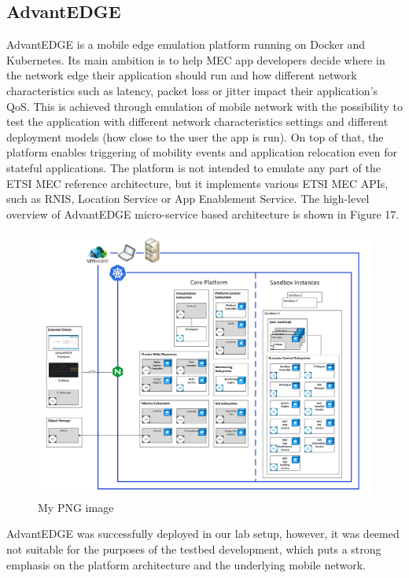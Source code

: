 \documentclass[12pt,a4paper,twoside]{report}
\begin{document}
\subsection{AdvantEDGE}
AdvantEDGE is a mobile edge emulation platform running on Docker and Kubernetes. Its main ambition is to help MEC app developers decide where in the network edge their application should run and how different network characteristics such as latency, packet loss or jitter impact their application’s QoS. This is achieved through emulation of mobile network with the possibility to test the application with different network characteristics settings and different deployment models (how close to the user the app is run). On top of that, the platform enables triggering of mobility events and application relocation even for stateful applications. The platform is not intended to emulate any part of the ETSI MEC reference architecture, but it implements various ETSI MEC APIs, such as RNIS, Location Service or App Enablement Service. The high-level overview of AdvantEDGE micro-service based architecture is shown in Figure 17.
\begin{figure}[ht]
	\centering
	\includegraphics[width=13cm]{./images/advatnedge.png} 
	\caption{My PNG image}
\end{figure}

AdvantEDGE was successfully deployed in our lab setup, however, it was deemed not suitable for the purposes of the testbed development, which puts a strong emphasis on the platform architecture and the underlying mobile network.
\end{document}
